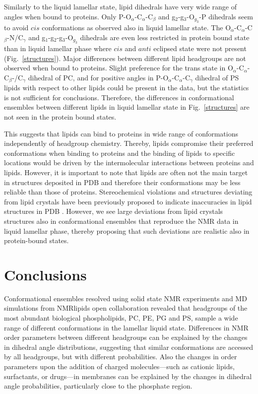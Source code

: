 \documentclass[aps,prl,superscriptaddress,twocolumn]{revtex4}
\begin{document}
Similarly to the liquid lamellar state, lipid dihedrals have very wide range of angles
when bound to proteins. Only %
P-O$_\alpha$-C$_\alpha$-C$_\beta$ and g$_2$-g$_3$-O$_{g_3}$-P dihedrals
seem to avoid $cis$ conformations as observed also in liquid lamellar state.
The %
O$_\alpha$-C$_\alpha$-C$_\beta$-N/C$_\gamma$ and
g$_1$-g$_2$-g$_3$-O$_{g_3}$ dihedrals are even less restricted in protein bound state
than in liquid lamellar phase where $cis$ and $anti$ eclipsed state were not present (Fig.~\ref{structures}). 
Major differences between different lipid headgroups are not observed when bound to proteins.
Slight preference for the trans state in O$_\alpha$-C$_\alpha$-C$_\beta$-/C$_\gamma$ dihedral of PC,
and for positive angles in P-O$_\alpha$-C$_\alpha$-C$_\gamma$ dihedral of PS lipids with respect
to other lipids could be present in the data, but the statistics is not sufficient for conclusions.
Therefore, the differences in conformational ensembles between different
lipids in liquid lamellar state in Fig.~\ref{structures} are not seen in the protein bound states.

This suggests that lipids can bind to proteins in wide range of conformations independently
of headgroup chemistry. Thereby, lipids compromise their preferred conformations when binding
to proteins and the binding of lipids to specific locations would be driven by 
the intermolecular interactions between proteins and lipids.
However, it is important to note that lipids are often not the main target in
structures deposited in PDB and therefore their conformations may be less reliable than those of proteins.
Stereochemical violations and structures deviating from lipid crystals have been
previously proposed to indicate inaccuracies in lipid structures in PDB \cite{marsh13b,pezeshkian18}. 
However, we see large deviations from lipid crystals structures also in conformational ensembles
that reproduce the NMR data in liquid lamellar phase, thereby proposing that such deviations
are realistic also in protein-bound states.

\section{Conclusions}

Conformational ensembles resolved using solid state NMR experiments and MD simulations
from NMRlipids open collaboration revealed that headgroups of the most abundant biological
phospholipids, PC, PE, PG and PS, sample a wide range of different conformations in the lamellar liquid state.
Differences in NMR order parameters between different headgroups can be explained
by the changes in dihedral angle distributions, suggesting that
similar conformations are accessed by all headgroups, but with different probabilities.
Also the changes in order parameters upon the addition of charged molecules---such as cationic lipids, surfactants, or drugs---in membranes can be explained by the changes in dihedral angle probabilities, particularly close to the phosphate region.
\end{document}
